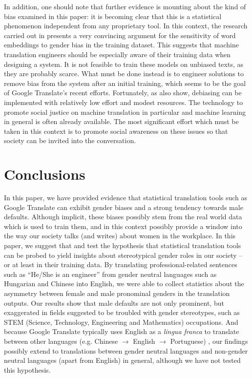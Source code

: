\documentclass[twoside,11pt]{article}
\begin{document}
In addition, one should note that further evidence is mounting about the kind of bias examined in this paper: it is becoming clear that this is a statistical phenomenon independent from any proprietary tool. In this context, the research carried out in \cite{bolukbasi2016man} presents a very convincing argument for the sensitivity of word embeddings to gender bias in the training dataset. This suggests that machine translation engineers should be especially aware of their training data when designing a system. It is not feasible to train these models on unbiased texts, as they are probably scarce. What must be done instead is to engineer solutions to remove bias from the system after an initial training, which seems to be the goal of Google Translate's recent efforts. Fortunately, as \cite{bolukbasi2016man} also show, debiasing can be implemented with relatively low effort and modest resources. The technology to promote social justice on machine translation in particular and machine learning in general is often already available. The most significant effort which must be taken in this context is to promote social awareness on these issues so that society can be invited into the conversation.

\section{Conclusions}

In this paper, we have provided evidence that statistical translation tools such as Google Translate can exhibit gender biases and a strong tendency towards male defaults. Although implicit, these biases possibly stem from the real world data which is used to train them, and in this context possibly provide a window into the way our society talks (and writes) about women in the workplace. In this paper, we suggest that and test the hypothesis that statistical translation tools can be probed to yield insights about stereotypical gender roles in our society -- or at least in their training data. By translating professional-related sentences such as ``He/She is an engineer'' from gender neutral languages such as Hungarian and Chinese into English, we were able to collect statistics about the asymmetry between female and male pronominal genders in the translation outputs. Our results show that male defaults are not only prominent, but exaggerated in fields suggested to be troubled with gender stereotypes, such as STEM (Science, Technology, Engineering and Mathematics) occupations. And because Google Translate typically uses English as a \emph{lingua franca} to translate between other languages (e.g. Chinese $\rightarrow$ English $\rightarrow$ Portuguese) \cite{LanguageSupportNMT2018,boitet2010mt}, our findings possibly extend to translations between gender neutral languages and non-gender neutral languages (apart from English) in general, although we have not tested this hypothesis.
\end{document}
